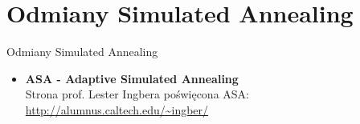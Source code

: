 \section{Odmiany Simulated Annealing}
	\begin{frame}{Odmiany Simulated Annealing}
		\begin{itemize}
			
			\item \textbf{ASA - Adaptive Simulated Annealing}\\			
			Strona prof. Lester Ingbera poświęcona ASA:\\
				\url{http://alumnus.caltech.edu/~ingber/}
			
			
			
			
		\end{itemize}

		
	\end{frame}